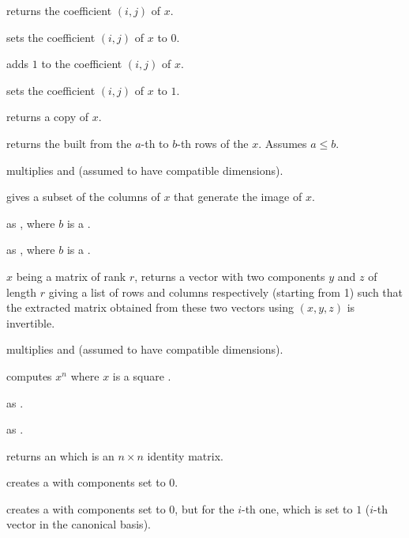  returns the coefficient $(i,j)$
of $x$.

 sets the coefficient $(i,j)$ of $x$
to $0$.

 adds $1$ to the coefficient $(i,j)$
of $x$.

 sets the coefficient $(i,j)$ of $x$
to $1$.

 returns a copy of $x$.

 returns the  built
from the $a$-th to $b$-th rows of the  $x$. Assumes $a \leq b$.

 multiplies   and  (assumed
to have compatible dimensions).

 gives a subset of the columns of $x$ that generate
the image of $x$.



as , where $b$ is a .

as , where $b$ is a .


 $x$ being a matrix of rank $r$, returns a
vector with two  components $y$ and $z$ of length $r$ giving a
list of rows and columns respectively (starting from 1) such that the extracted
matrix obtained from these two vectors using $(x,y,z)$ is
invertible.

 multiplies   and  (assumed to
have compatible dimensions).

 computes $x^n$ where $x$ is a square
.

 as .

 as .

 returns an  which is an $n \times n$
identity matrix.

 creates a  with  components set to
$0$.

 creates a  with  components
set to $0$, but for the $i$-th one, which is set to $1$ ($i$-th vector in the
canonical basis).

